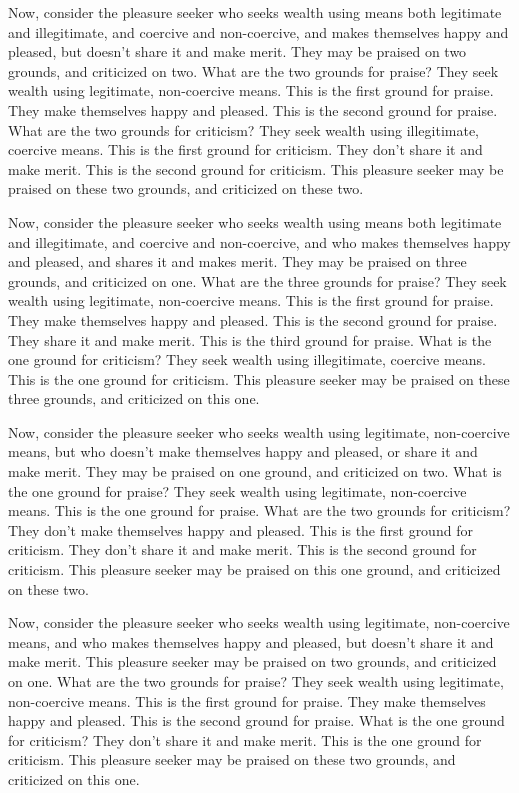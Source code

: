 \documentclass[12pt,openany]{book}%
\begin{document}
Now, consider the pleasure seeker who seeks wealth using means both legitimate and illegitimate, and coercive and non-coercive, and makes themselves happy and pleased, but doesn’t share it and make merit. They may be praised on two grounds, and criticized on two. What are the two grounds for praise? They seek wealth using legitimate, non-coercive means. This is the first ground for praise. They make themselves happy and pleased. This is the second ground for praise. What are the two grounds for criticism? They seek wealth using illegitimate, coercive means. This is the first ground for criticism. They don’t share it and make merit. This is the second ground for criticism. This pleasure seeker may be praised on these two grounds, and criticized on these two. 

Now, consider the pleasure seeker who seeks wealth using means both legitimate and illegitimate, and coercive and non-coercive, and who makes themselves happy and pleased, and shares it and makes merit. They may be praised on three grounds, and criticized on one. What are the three grounds for praise? They seek wealth using legitimate, non-coercive means. This is the first ground for praise. They make themselves happy and pleased. This is the second ground for praise. They share it and make merit. This is the third ground for praise. What is the one ground for criticism? They seek wealth using illegitimate, coercive means. This is the one ground for criticism. This pleasure seeker may be praised on these three grounds, and criticized on this one. 

Now, consider the pleasure seeker who seeks wealth using legitimate, non-coercive means, but who doesn’t make themselves happy and pleased, or share it and make merit. They may be praised on one ground, and criticized on two. What is the one ground for praise? They seek wealth using legitimate, non-coercive means. This is the one ground for praise. What are the two grounds for criticism? They don’t make themselves happy and pleased. This is the first ground for criticism. They don’t share it and make merit. This is the second ground for criticism. This pleasure seeker may be praised on this one ground, and criticized on these two. 

Now, consider the pleasure seeker who seeks wealth using legitimate, non-coercive means, and who makes themselves happy and pleased, but doesn’t share it and make merit. This pleasure seeker may be praised on two grounds, and criticized on one. What are the two grounds for praise? They seek wealth using legitimate, non-coercive means. This is the first ground for praise. They make themselves happy and pleased. This is the second ground for praise. What is the one ground for criticism? They don’t share it and make merit. This is the one ground for criticism. This pleasure seeker may be praised on these two grounds, and criticized on this one. 
\end{document}
